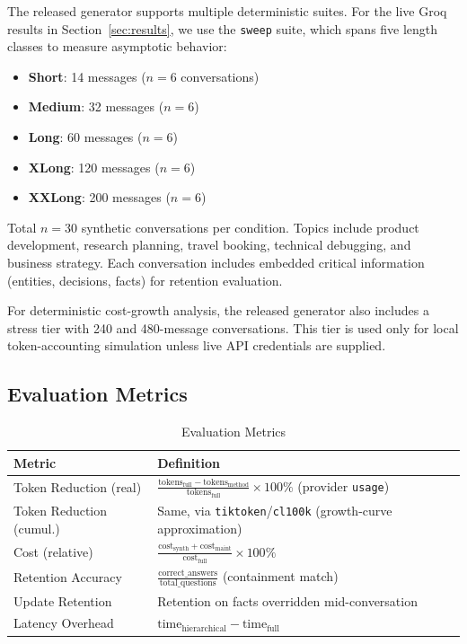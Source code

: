 \documentclass[conference]{IEEEtran}
\begin{document}
The released generator supports multiple deterministic suites. For the live Groq
results in Section~\ref{sec:results}, we use the \texttt{sweep} suite, which
spans five length classes to measure asymptotic behavior:
\begin{itemize}
    \item \textbf{Short}: 14 messages ($n = 6$ conversations)
    \item \textbf{Medium}: 32 messages ($n = 6$)
    \item \textbf{Long}: 60 messages ($n = 6$)
    \item \textbf{XLong}: 120 messages ($n = 6$)
    \item \textbf{XXLong}: 200 messages ($n = 6$)
\end{itemize}
Total $n = 30$ synthetic conversations per condition. Topics include product
development, research planning, travel booking, technical debugging, and
business strategy. Each conversation includes embedded critical information
(entities, decisions, facts) for retention evaluation.

For deterministic cost-growth analysis, the released generator also
includes a stress tier with 240 and 480-message conversations. This tier is used
only for local token-accounting simulation unless live API credentials are
supplied.

\subsection{Evaluation Metrics}

\begin{table}[h]
\centering
\caption{Evaluation Metrics}
\label{tab:metrics}
\small
\setlength{\tabcolsep}{3pt}
\begin{tabular}{p{}p{}}
\toprule
\textbf{Metric} & \textbf{Definition} \\
\midrule
Token Reduction (real) & $\frac{\text{tokens}_{\text{full}} - \text{tokens}_{\text{method}}}{\text{tokens}_{\text{full}}} \times 100\%$ (provider \texttt{usage}) \\
Token Reduction (cumul.) & Same, via \texttt{tiktoken}/\texttt{cl100k} (growth-curve approximation) \\
Cost (relative) & $\frac{\text{cost}_{\text{synth}} + \text{cost}_{\text{maint}}}{\text{cost}_{\text{full}}} \times 100\%$ \\
Retention Accuracy & $\frac{\text{correct\_answers}}{\text{total\_questions}}$ (containment match) \\
Update Retention & Retention on facts overridden mid-conversation \\
Latency Overhead & $\text{time}_{\text{hierarchical}} - \text{time}_{\text{full}}$ \\
\bottomrule
\end{tabular}
\end{table}
\end{document}
